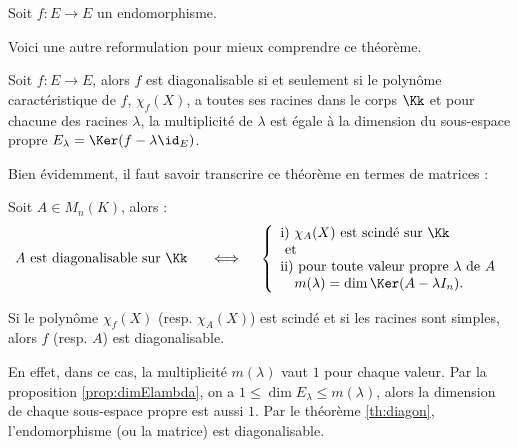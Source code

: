 \documentclass[12pt, class=report,crop=false]{standalone}
\begin{document}
\begin{theoreme}
\label{th:diagon}
Soit $f :  E \to E$ un endomorphisme.
\end{theoreme}


Voici une autre reformulation pour mieux comprendre ce théorème.

Soit $f : E \to E$, alors $f$ est diagonalisable si et seulement si le polynôme caractéristique de
$f$, $\chi_f(X)$, a toutes ses racines dans le corps $\Kk$ et pour 
chacune des racines $\lambda$, la multiplicité de $\lambda$ est égale 
  à la dimension du sous-espace propre $E_\lambda = \Ker(f-\lambda \id_E)$.
  
\bigskip

Bien évidemment, il faut savoir transcrire ce théorème en termes de matrices :
  
Soit $A \in M_n(K)$, alors :
\[A \text{ est diagonalisable sur $\Kk$ } \quad\iff\quad \left\{\begin{array}{l}
\text{i) } \chi_A(X) \text{ est scindé sur $\Kk$}\\
\text{ et }\\
\text{ii) pour toute valeur propre $\lambda$ de $A$} \\ \quad m(\lambda) = \dim \Ker(A-\lambda I_n).
\end{array}\right.\]

\begin{corollaire}
\label{cor:diagon}
Si le polynôme $\chi_f(X)$ (resp. $\chi_A(X)$) est scindé et si les racines sont simples, alors $f$ (resp. $A$) est diagonalisable.
\end{corollaire}

En effet, dans ce cas, la multiplicité $m(\lambda)$ vaut $1$ pour chaque valeur.
Par la proposition \ref{prop:dimElambda}, on a $1 \le \dim E_\lambda \le m(\lambda)$, alors la dimension de chaque sous-espace propre est aussi $1$. Par le théorème \ref{th:diagon}, l'endomorphisme (ou la matrice) est diagonalisable.
\end{document}
